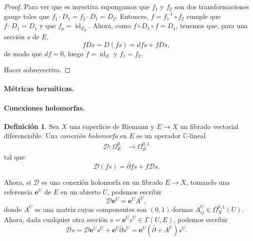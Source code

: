 \documentclass[12pt,a4paper]{article}
\theoremstyle{definition} \newtheorem{defn}[thm]{Definición}
\theoremstyle{definition} \newtheorem{ejemplo}[thm]{Ejemplo}
\theoremstyle{definition} \newtheorem{ejercicio}[thm]{Ejercicio}
\def\CC{\mathbb{C}}
\DeclareMathOperator{\id}{id}
\def\delbar{\bar{\partial}}
\begin{document}
		 \begin{proof}
		   Para ver que es inyectiva supongamos que $f_1$ y $f_2$ son dos transformaciones gauge tales que $f_1 \cdot D_1 = f_2 \cdot D_1 = D_2$. Entonces, $f=f_1^{-1} \circ f_2$ cumple que $f \cdot D_1 = D_1$ y que $f_p = \id_{E_p}$. Ahora, como $f\circ D_1 \circ f = D_1$, tenemos que, para una sección $s$ de $E$,
		   \begin{equation*}
		     f D s = D(fs) = df s + f Ds, 
		   \end{equation*}
		   de modo que $df=0$, luego $f=\id_E$ y $f_1=f_2$.

		   Hacer sobreyectiva.
		 \end{proof}


	  \paragraph{Métricas hermíticas.}

	      \paragraph{Conexiones holomorfas.}
\begin{defn}
  Sea $X$ una superficie de Riemann y $E\rightarrow X$ un fibrado vectorial diferenciable. Una \emph{conexión holomorfa} en $E$ es un operador $\CC$-lineal
  \begin{align*}
    \mathcal{D} :\Omega^0_E &\longrightarrow \Omega^{0,1}_E
    \end{align*}
    tal que
    \begin{equation*}
      \mathcal{D} (fs)=\delbar f s + f \mathcal{D} s.
    \end{equation*}
\end{defn}

Ahora, si $\mathcal{D}$ es una conexión holomorfa en un fibrado $E\rightarrow X$, tomando una referencia $\mathbf{e}^U$ de $E$ en un abierto $U$, podemos escribir 
\begin{equation*}
  \mathcal{D} \mathbf{e}^U = \mathbf{e}^U A^U, 
\end{equation*}
donde $A^U$ es una matriz cuyas componentes son $(0,1)$-formas $A^U_{ij} \in \Omega^{0,1}_X(U)$. Ahora, dada cualquier otra sección $s= \mathbf{e}^U s^U \in\Gamma(U,E)$, podemos escribir 
\begin{equation*}
  \mathcal{D} s = \mathcal{D} \mathbf{e}^U s^U + \mathbf{e}^U \delbar s^U = \mathbf{e}^U (\delbar + A^U) s^U.
\end{equation*}
\end{document}
